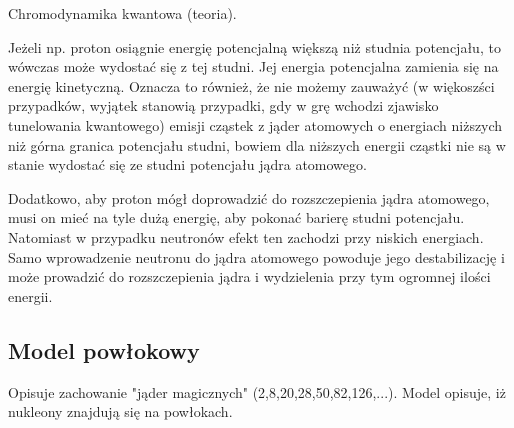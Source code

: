 \documentclass{article}
\begin{document}
Chromodynamika kwantowa (teoria).

Jeżeli np. proton osiągnie energię potencjalną większą niż studnia potencjału, to wówczas może wydostać się z tej studni. Jej energia potencjalna zamienia się na energię kinetyczną. Oznacza to również, że nie możemy zauważyć (w więkoszści przypadków, wyjątek stanowią przypadki, gdy w grę wchodzi zjawisko tunelowania kwantowego) emisji cząstek z jąder atomowych o energiach niższych niż górna granica potencjału studni, bowiem dla niższych energii cząstki nie są w stanie wydostać się ze studni potencjału jądra atomowego.

Dodatkowo, aby proton mógł doprowadzić do rozszczepienia jądra atomowego, musi on mieć na tyle dużą energię, aby pokonać barierę studni potencjału. Natomiast w przypadku neutronów efekt ten zachodzi przy niskich energiach. Samo wprowadzenie neutronu do jądra atomowego powoduje jego destabilizację i może prowadzić do rozszczepienia jądra i wydzielenia przy tym ogromnej ilości energii.

\subsection{Model powłokowy}
Opisuje zachowanie "jąder magicznych" (2,8,20,28,50,82,126,...).
Model opisuje, iż nukleony znajdują się na powłokach.
\end{document}
